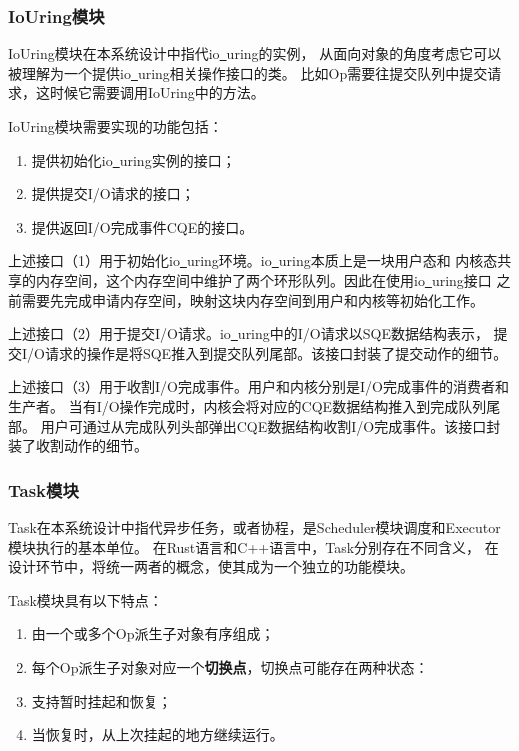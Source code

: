 \documentclass[supercite]{HustGraduPaper}
\newcommand*{\circled}[1]{\lower.7ex\hbox{\tikz\draw (0pt, 0pt)%
    circle (.5em) node {\makebox[1em][c]{\small #1}};}}
\theoremstyle{definition}
\begin{document}
\subsubsection{IoUring模块}

IoUring模块在本系统设计中指代io\underline{~}uring的实例，
从面向对象的角度考虑它可以被理解为一个提供io\underline{~}uring相关操作接口的类。
比如Op需要往提交队列中提交请求，这时候它需要调用IoUring中的方法。\par

IoUring模块需要实现的功能包括：

\begin{enumerate}[label={(\arabic*)}]
  \item 提供初始化io\underline{~}uring实例的接口；
  \item 提供提交I/O请求的接口；
  \item 提供返回I/O完成事件CQE的接口。
\end{enumerate}

上述接口（1）用于初始化io\underline{~}uring环境。io\underline{~}uring本质上是一块用户态和
内核态共享的内存空间，这个内存空间中维护了两个环形队列。因此在使用io\underline{~}uring接口
之前需要先完成申请内存空间，映射这块内存空间到用户和内核等初始化工作。\par

上述接口（2）用于提交I/O请求。io\underline{~}uring中的I/O请求以SQE数据结构表示，
提交I/O请求的操作是将SQE推入到提交队列尾部。该接口封装了提交动作的细节。\par

上述接口（3）用于收割I/O完成事件。用户和内核分别是I/O完成事件的消费者和生产者。
当有I/O操作完成时，内核会将对应的CQE数据结构推入到完成队列尾部。
用户可通过从完成队列头部弹出CQE数据结构收割I/O完成事件。该接口封装了收割动作的细节。\par

\subsubsection{Task模块}

Task在本系统设计中指代异步任务，或者协程，是Scheduler模块调度和Executor模块执行的基本单位。
在Rust语言和C++语言中，Task分别存在不同含义，
在设计环节中，将统一两者的概念，使其成为一个独立的功能模块。\par

Task模块具有以下特点：
\begin{enumerate}[label={(\arabic*)}]
  \item 由一个或多个Op派生子对象有序组成；
  \item 每个Op派生子对象对应一个\textbf{切换点}，切换点可能存在两种状态：
  \item 支持暂时挂起和恢复；
  \item 当恢复时，从上次挂起的地方继续运行。
\end{enumerate}
\end{document}
